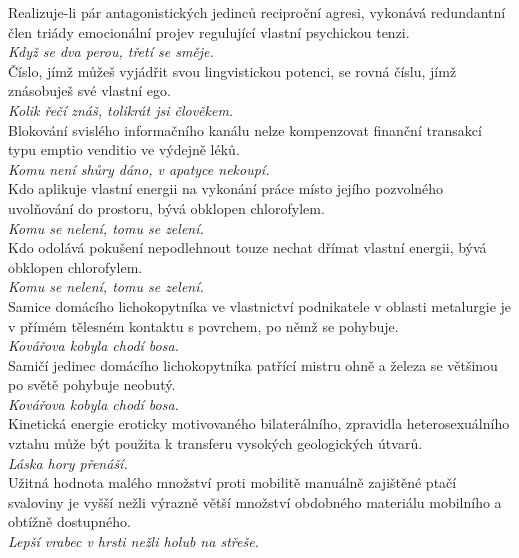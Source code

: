 \begin{multicols}{2}
\noindent
Realizuje-li pár antagonistických jedinců reciproční agresi,
vykonává redundantní člen triády emocionální projev regulující
vlastní psychickou tenzi.\\[1 mm]
{\sl Když se dva perou, třetí se směje.}\\

\noindent
Číslo, jímž můžeš vyjádřit svou lingvistickou potenci, se
rovná číslu, jímž znásobuješ své vlastní ego.\\[1 mm]
{\sl Kolik řečí znáš, tolikrát jsi člověkem.}\\

\noindent
Blokování svislého informačního kanálu nelze kompenzovat
finanční transakcí typu emptio venditio ve výdejně léků.\\[1 mm]
{\sl Komu není shůry dáno, v apatyce nekoupí.}\\

\noindent
Kdo aplikuje vlastní energii na vykonání práce místo jejího
pozvolného uvolňování do prostoru, bývá obklopen chlorofylem.\\[1 mm]
{\sl Komu se nelení, tomu se zelení.}\\

\noindent
Kdo odolává pokušení nepodlehnout touze nechat dřímat vlastní
energii, bývá obklopen chlorofylem.\\[1 mm]
{\sl Komu se nelení, tomu se zelení.}\\

\noindent
Samice domácího lichokopytníka ve vlastnictví podnikatele v oblasti
metalurgie je v přímém tělesném kontaktu s povrchem, po němž se
pohybuje.\\[1 mm]
{\sl Kovářova kobyla chodí bosa.}\\

\noindent
Samičí jedinec domácího lichokopytníka patřící mistru ohně
a železa se většinou po světě pohybuje neobutý.\\[1 mm]
{\sl Kovářova kobyla chodí bosa.}\\

\noindent
Kinetická energie eroticky motivovaného bilaterálního, zpravidla
heterosexuálního vztahu může být použita k transferu vysokých
geologických útvarů.\\[1 mm]
{\sl Láska hory přenáší.}\\

\noindent
Užitná hodnota malého množství proti mobilitě manuálně zajištěné
ptačí svaloviny je vyšší nežli výrazně větší množství obdobného materiálu
mobilního a obtížně dostupného.\\[1 mm]
{\sl Lepší vrabec v hrsti nežli holub na střeše.}\\


\end{multicols}
